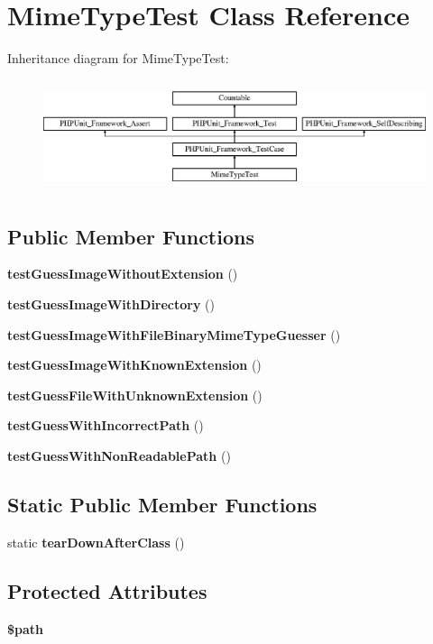 \section{Mime\+Type\+Test Class Reference}
\label{class_symfony_1_1_component_1_1_http_foundation_1_1_tests_1_1_file_1_1_mime_type_1_1_mime_type_test}
Inheritance diagram for Mime\+Type\+Test\+:\begin{figure}[H]
\begin{center}
\leavevmode
\includegraphics[height=3.303835cm]{class_symfony_1_1_component_1_1_http_foundation_1_1_tests_1_1_file_1_1_mime_type_1_1_mime_type_test}
\end{center}
\end{figure}
\subsection*{Public Member Functions}
\begin{DoxyCompactItemize}
\item 
{\bf test\+Guess\+Image\+Without\+Extension} ()
\item 
{\bf test\+Guess\+Image\+With\+Directory} ()
\item 
{\bf test\+Guess\+Image\+With\+File\+Binary\+Mime\+Type\+Guesser} ()
\item 
{\bf test\+Guess\+Image\+With\+Known\+Extension} ()
\item 
{\bf test\+Guess\+File\+With\+Unknown\+Extension} ()
\item 
{\bf test\+Guess\+With\+Incorrect\+Path} ()
\item 
{\bf test\+Guess\+With\+Non\+Readable\+Path} ()
\end{DoxyCompactItemize}
\subsection*{Static Public Member Functions}
\begin{DoxyCompactItemize}
\item 
static {\bf tear\+Down\+After\+Class} ()
\end{DoxyCompactItemize}
\subsection*{Protected Attributes}
\begin{DoxyCompactItemize}
\item 
{\bf \$path}
\end{DoxyCompactItemize}
